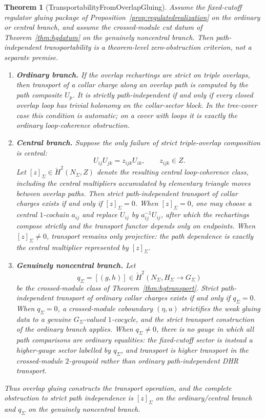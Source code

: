 \documentclass[11pt]{article}
\newtheorem{theorem}{Theorem}[section]
\begin{document}
\begin{theorem}[TransportabilityFromOverlapGluing]\label{thm:transport-from-gluing}
Assume the fixed-cutoff regulator gluing package of Proposition~\ref{prop:regulatedrealization}
on the ordinary or central branch, and assume the crossed-module cut datum of
Theorem~\ref{thm:hgdatum} on the genuinely noncentral branch. Then path-independent
transportability is a theorem-level zero-obstruction criterion, not a separate premise.
\begin{enumerate}[label=\textup{(\roman*)},leftmargin=2em]
\item \textbf{Ordinary branch.} If the overlap rechartings are strict on triple overlaps, then
transport of a collar charge along an overlap path is computed by the path composite \(U_p\).
It is strictly path-independent if and only if every closed overlap loop has trivial holonomy on
the collar-sector block. In the tree-cover case this condition is automatic; on a cover with
loops it is exactly the ordinary loop-coherence obstruction.
\item \textbf{Central branch.} Suppose the only failure of strict triple-overlap composition is
central:
\[
U_{ij}U_{jk}=z_{ijk}U_{ik},\qquad z_{ijk}\in Z.
\]
Let \([z]_\Sigma\in \check H^2(N_\Sigma,Z)\) denote the resulting central loop-coherence class,
including the central multipliers accumulated by elementary triangle moves between overlap
paths. Then strict path-independent transport of collar charges exists if and only if
\([z]_\Sigma=0\). When \([z]_\Sigma=0\), one may choose a central \(1\)-cochain \(a_{ij}\) and
replace \(U_{ij}\) by \(a_{ij}^{-1}U_{ij}\), after which the rechartings compose strictly and the
transport functor depends only on endpoints. When \([z]_\Sigma\ne0\), transport remains only
projective: the path dependence is exactly the central multiplier represented by
\([z]_\Sigma\).
\item \textbf{Genuinely noncentral branch.} Let
\[
q_\Sigma=[(g,h)]\in \check H^2(N_\Sigma,H_\Sigma\to G_\Sigma)
\]
be the crossed-module class of Theorem~\ref{thm:hgtransport}. Strict path-independent transport
of ordinary collar charges exists if and only if \(q_\Sigma=0\). When \(q_\Sigma=0\), a
crossed-module coboundary \((\eta,u)\) strictifies the weak gluing data to a genuine
\(G_\Sigma\)-valued \(1\)-cocycle, and the strict transport construction of the ordinary branch
applies. When \(q_\Sigma\ne0\), there is no gauge in which all path comparisons are ordinary
equalities: the fixed-cutoff sector is instead a higher-gauge sector labelled by \(q_\Sigma\),
and transport is higher transport in the crossed-module \(2\)-groupoid rather than ordinary
path-independent DHR transport.
\end{enumerate}
Thus overlap gluing constructs the transport
operation, and the complete obstruction to strict path independence is \([z]_\Sigma\) on the
ordinary/central branch and \(q_\Sigma\) on the genuinely noncentral branch.
\end{theorem}
\end{document}

